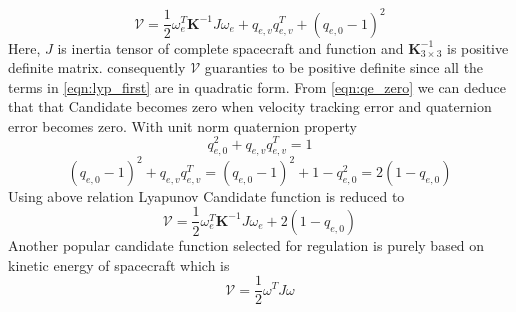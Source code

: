 \begin{equation}
\mathcal{V} =\frac{1}{2} \omega ^{T}_{e}\mathbf{K}^{-1} J\omega _{e} +q_{e,v} q^{T}_{e,v} +( q_{e,0} -1)^{2}
\label{eqn:lyp_first}
\end{equation}
Here, $\displaystyle J$ is inertia tensor of complete spacecraft and function and $\displaystyle \mathbf{K}^{-1}_{3\times 3}$ is positive definite matrix. consequently $\displaystyle \mathcal{V}$ guaranties to be positive definite since all the terms in \autoref{eqn:lyp_first} are in quadratic form. From \autoref{eqn:qe_zero} we can deduce that that Candidate becomes zero when velocity tracking error and quaternion error becomes zero. With unit norm quaternion property
\begin{equation}
q^{2}_{e,0} +q_{e,v} q^{T}_{e,v} =1
\end{equation}
\begin{equation}
( q_{e,0} -1)^{2} +q_{e,v} q^{T}_{e,v} =( q_{e,0} -1)^{2} +1-q^{2}_{e,0} =2( 1-q_{e,0})
\label{eqn:unit_norm_quat_rearanged}
\end{equation}
Using above relation Lyapunov Candidate function is reduced to
\begin{equation}
\mathcal{V} =\frac{1}{2} \omega ^{T}_{e}\mathbf{K}^{-1} J\omega _{e} +2( 1-q_{e,0})
\label{eqn:lyp_first_reduced}
\end{equation}
Another popular candidate function selected for regulation is purely based on kinetic energy of spacecraft which is \cite{Leve2015}
\begin{equation}
\mathcal{V} =\frac{1}{2} \omega ^{T} J\omega 
\end{equation}

